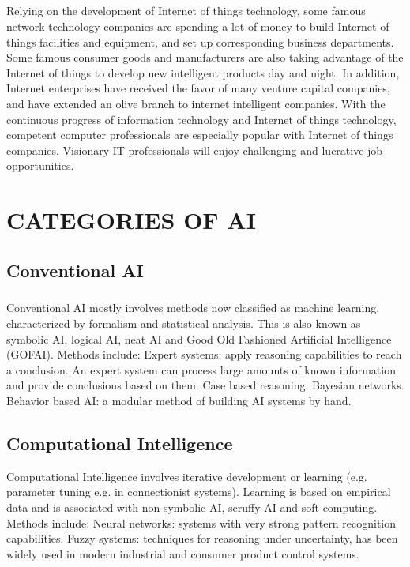 \documentclass[12pt]{report}
\begin{document}
\paragraph{}
Relying on the development of Internet of things technology, some famous network
technology companies are spending a lot of money to build Internet of things facilities and
equipment, and set up corresponding business departments. Some famous consumer goods
and manufacturers are also taking advantage of the Internet of things to develop new
intelligent products day and night. In addition, Internet enterprises have received the favor
of many venture capital companies, and have extended an olive branch to internet
intelligent companies. With the continuous progress of information technology and
Internet of things technology, competent computer professionals are especially popular
with Internet of things companies. Visionary IT professionals will enjoy challenging and
lucrative job opportunities.

\chapter{CATEGORIES OF AI}
 \section{Conventional AI }
\paragraph{} Conventional AI mostly involves methods now classified as
machine learning, characterized by formalism and statistical analysis. This is also known as
symbolic AI, logical AI, neat AI and Good Old Fashioned Artificial Intelligence (GOFAI).
Methods include: Expert systems: apply reasoning capabilities to reach a conclusion. An expert
system can process large amounts of known information and provide conclusions based on them.
Case based reasoning. Bayesian networks. Behavior based AI: a modular method of building AI
systems by hand.
\section{Computational Intelligence }
\par Computational Intelligence involves iterative
development or learning (e.g. parameter tuning e.g. in connectionist systems). Learning is based
on empirical data and is associated with non-symbolic AI, scruffy AI and soft computing.
Methods include: Neural networks: systems with very strong pattern recognition capabilities.
Fuzzy systems: techniques for reasoning under uncertainty, has been widely used in modern
industrial and consumer product control systems.
\newpage
\end{document}

